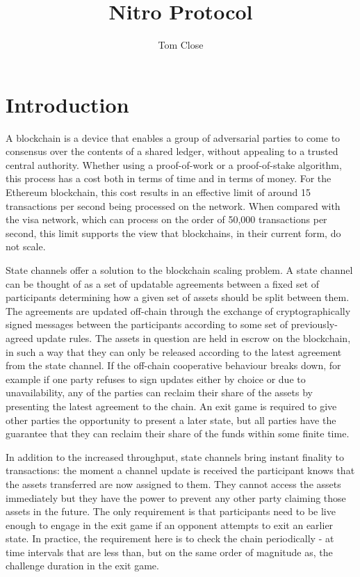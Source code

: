 \documentclass{article}
\title{Nitro Protocol}
\author{Tom Close}
\theoremstyle{definition}
\begin{document}
\maketitle

\section{Introduction}

A blockchain is a device that enables a group of adversarial parties to come to consensus over the contents of a shared ledger, without appealing to a trusted central authority. 
Whether using a proof-of-work or a proof-of-stake algorithm, this process has a cost both in terms of time and in terms of money.
For the Ethereum blockchain, this cost results in an effective limit of around 15 transactions per second being processed on the network.
When compared with the visa network, which can process on the order of 50,000 transactions per second, this limit supports the view that blockchains, in their current form, do not scale.

State channels offer a solution to the blockchain scaling problem.
A state channel can be thought of as a set of updatable agreements between a fixed set of participants determining how a given set of assets should be split between them.
The agreements are updated off-chain through the exchange of cryptographically signed messages between the participants according to some set of previously-agreed update rules. 
The assets in question are held in escrow on the blockchain, in such a way
that they can only be released according to the latest agreement from the state channel.
If the off-chain cooperative behaviour breaks down, for example if one party refuses to sign updates either by choice or due to unavailability, any of the parties can reclaim their share of the assets by presenting the latest agreement to the chain.
An exit game is required to give other parties the opportunity to present a later state, but all parties have the guarantee that they can reclaim their share of the funds within some finite time.

In addition to the increased throughput, state channels bring instant finality to transactions: the moment a channel update is received the participant knows that the assets transferred are now assigned to them.
They cannot access the assets immediately but they have the power to prevent any other party claiming those assets in the future.
The only requirement is that participants need to be live enough to engage in the exit game if an opponent attempts to exit an earlier state.
In practice, the requirement here is to check the chain periodically - at time intervals that are less than, but on the same order of magnitude as, the challenge duration in the exit game.
\end{document}
